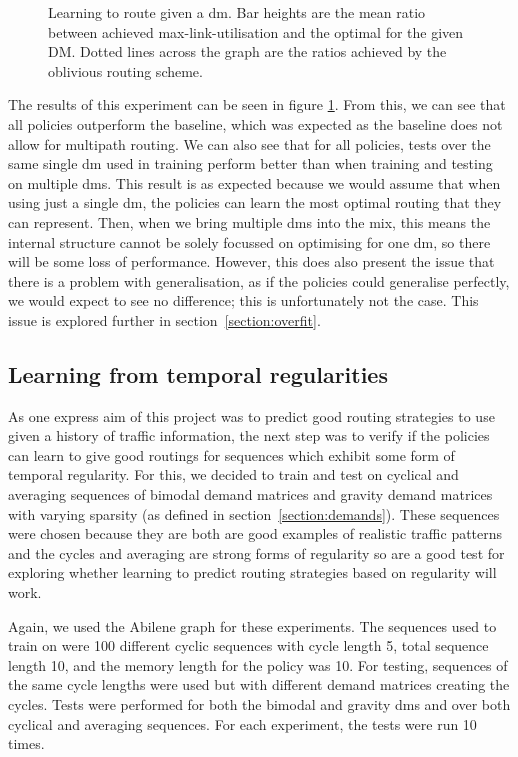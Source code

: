 \begin{figure}
    \centering
    
    \caption{Learning to route given a \ac{dm}. Bar heights are the mean ratio between achieved max-link-utilisation and the optimal for the given DM. Dotted lines across the graph are the ratios achieved by the oblivious routing scheme.}
    \label{fig:exp_static}
\end{figure}

The results of this experiment can be seen in figure \ref{fig:exp_static}. From this, we can see that all policies outperform the baseline, which was expected as the baseline does not allow for multipath routing. We can also see that for all policies, tests over the same single \ac{dm} used in training perform better than when training and testing on multiple \acp{dm}. This result is as expected because we would assume that when using just a single \ac{dm}, the policies can learn the most optimal routing that they can represent. Then, when we bring multiple \acp{dm} into the mix, this means the internal structure cannot be solely focussed on optimising for one \ac{dm}, so there will be some loss of performance. However, this does also present the issue that there is a problem with generalisation, as if the policies could generalise perfectly, we would expect to see no difference; this is unfortunately not the case. This issue is explored further in section~\ref{section:overfit}.


\subsection{Learning from temporal regularities}
As one express aim of this project was to predict good routing strategies to use given a history of traffic information, the next step was to verify if the policies can learn to give good routings for sequences which exhibit some form of temporal regularity. For this, we decided to train and test on cyclical and averaging sequences of bimodal demand matrices and gravity demand matrices with varying sparsity (as defined in section~\ref{section:demands}). These sequences were chosen because they are both are good examples of realistic traffic patterns and the cycles and averaging are strong forms of regularity so are a good test for exploring whether learning to predict routing strategies based on regularity will work.

Again, we used the Abilene graph for these experiments. The sequences used to train on were 100 different cyclic sequences with cycle length 5, total sequence length 10, and the memory length for the policy was 10. For testing, sequences of the same cycle lengths were used but with different demand matrices creating the cycles. Tests were performed for both the bimodal and gravity \acp{dm} and over both cyclical and averaging sequences. For each experiment, the tests were run 10 times.

